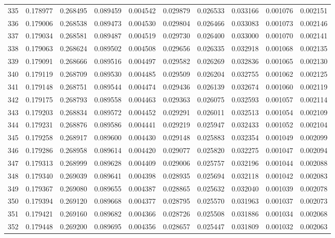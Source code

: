 \begin{tabular}{lrrrrrrrrr}
335 & 0.178977 & 0.268495 & 0.089459 & 0.004542 & 0.029879 & 0.026533 & 0.033166 & 0.001076 & 0.002151 \\
336 & 0.179006 & 0.268538 & 0.089473 & 0.004530 & 0.029804 & 0.026466 & 0.033083 & 0.001073 & 0.002146 \\
337 & 0.179034 & 0.268581 & 0.089487 & 0.004519 & 0.029730 & 0.026400 & 0.033000 & 0.001070 & 0.002141 \\
338 & 0.179063 & 0.268624 & 0.089502 & 0.004508 & 0.029656 & 0.026335 & 0.032918 & 0.001068 & 0.002135 \\
339 & 0.179091 & 0.268666 & 0.089516 & 0.004497 & 0.029582 & 0.026269 & 0.032836 & 0.001065 & 0.002130 \\
340 & 0.179119 & 0.268709 & 0.089530 & 0.004485 & 0.029509 & 0.026204 & 0.032755 & 0.001062 & 0.002125 \\
341 & 0.179148 & 0.268751 & 0.089544 & 0.004474 & 0.029436 & 0.026139 & 0.032674 & 0.001060 & 0.002119 \\
342 & 0.179175 & 0.268793 & 0.089558 & 0.004463 & 0.029363 & 0.026075 & 0.032593 & 0.001057 & 0.002114 \\
343 & 0.179203 & 0.268834 & 0.089572 & 0.004452 & 0.029291 & 0.026011 & 0.032513 & 0.001054 & 0.002109 \\
344 & 0.179231 & 0.268876 & 0.089586 & 0.004441 & 0.029219 & 0.025947 & 0.032433 & 0.001052 & 0.002104 \\
345 & 0.179258 & 0.268917 & 0.089600 & 0.004430 & 0.029148 & 0.025883 & 0.032354 & 0.001049 & 0.002099 \\
346 & 0.179286 & 0.268958 & 0.089614 & 0.004420 & 0.029077 & 0.025820 & 0.032275 & 0.001047 & 0.002094 \\
347 & 0.179313 & 0.268999 & 0.089628 & 0.004409 & 0.029006 & 0.025757 & 0.032196 & 0.001044 & 0.002088 \\
348 & 0.179340 & 0.269039 & 0.089641 & 0.004398 & 0.028935 & 0.025694 & 0.032118 & 0.001042 & 0.002083 \\
349 & 0.179367 & 0.269080 & 0.089655 & 0.004387 & 0.028865 & 0.025632 & 0.032040 & 0.001039 & 0.002078 \\
350 & 0.179394 & 0.269120 & 0.089668 & 0.004377 & 0.028795 & 0.025570 & 0.031963 & 0.001037 & 0.002073 \\
351 & 0.179421 & 0.269160 & 0.089682 & 0.004366 & 0.028726 & 0.025508 & 0.031886 & 0.001034 & 0.002068 \\
352 & 0.179448 & 0.269200 & 0.089695 & 0.004356 & 0.028657 & 0.025447 & 0.031809 & 0.001032 & 0.002063 \\

\end{tabular}
